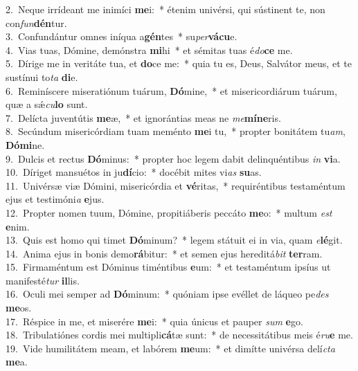{2.~}Neque irrídeant me inimíci \textbf{me}i:~* étenim univérsi, qui sústinent te, non con\textit{fun}\textbf{dén}tur.\\
{3.~}Confundántur omnes iníqua a\textbf{gén}tes~* su\textit{per}\textbf{vá}\textbf{cu}e.\\
{4.~}Vias tuas, Dómine, demónstra \textbf{mi}hi~* et sémitas tuas é\textit{do}\textbf{ce} me.\\
{5.~}Dírige me in veritáte tua, et \textbf{do}ce me:~* quia tu es, Deus, Salvátor meus, et te sustínui to\textit{ta} \textbf{di}e.\\
{6.~}Reminíscere miseratiónum tuárum, \textbf{Dó}mine,~* et misericordiárum tuárum, quæ a sǽ\textit{cu}\textbf{lo} sunt.\\
{7.~}Delícta juventútis \textbf{me}æ,~* et ignorántias meas ne \textit{me}\textbf{mí}\textbf{ne}ris.\\
{8.~}Secúndum misericórdiam tuam meménto \textbf{me}i tu,~* propter bonitátem tu\textit{am}, \textbf{Dó}\textbf{mi}ne.\\
{9.~}Dulcis et rectus \textbf{Dó}minus:~* propter hoc legem dabit delinquéntibus \textit{in} \textbf{vi}a.\\
{10.~}Díriget mansuétos in ju\textbf{dí}cio:~* docébit mites vi\textit{as} \textbf{su}as.\\
{11.~}Univérsæ viæ Dómini, misericórdia et \textbf{vé}ritas,~* requiréntibus testaméntum ejus et testimóni\textit{a} \textbf{e}jus.\\
{12.~}Propter nomen tuum, Dómine, propitiáberis peccáto \textbf{me}o:~* multum \textit{est} \textbf{e}nim.\\
{13.~}Quis est homo qui timet \textbf{Dó}minum?~* legem státuit ei in via, quam \textit{e}\textbf{lé}git.\\
{14.~}Anima ejus in bonis demo\textbf{rá}bitur:~* et semen ejus hereditá\textit{bit} \textbf{ter}ram.\\
{15.~}Firmaméntum est Dóminus timéntibus \textbf{e}um:~* et testaméntum ipsíus ut manifesté\textit{tur} \textbf{il}lis.\\
{16.~}Oculi mei semper ad \textbf{Dó}minum:~* quóniam ipse evéllet de láqueo pe\textit{des} \textbf{me}os.\\
{17.~}Réspice in me, et miserére \textbf{me}i:~* quia únicus et pauper \textit{sum} \textbf{e}go.\\
{18.~}Tribulatiónes cordis mei multipli\textbf{cá}tæ sunt:~* de necessitátibus meis é\textit{ru}\textbf{e} me.\\
{19.~}Vide humilitátem meam, et labórem \textbf{me}um:~* et dimítte univérsa delí\textit{cta} \textbf{me}a.\\

